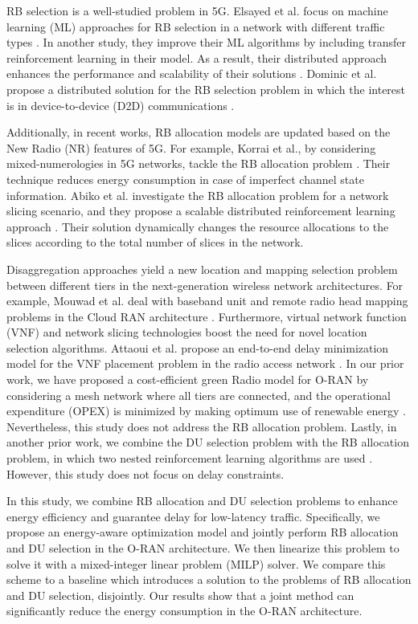 \documentclass[conference]{IEEEtran}
\begin{document}
\par RB selection is a well-studied problem in 5G. Elsayed et al. focus on machine learning (ML) approaches for RB selection in a network with different traffic types \cite{Elsayed2019}. In another study, they improve their ML algorithms by including transfer reinforcement learning in their model. As a result, their distributed approach enhances the performance and scalability of their solutions \cite{Elsayed2020}. Dominic et al. propose a distributed solution for the RB selection problem in which the interest is in device-to-device (D2D) communications \cite{Dominic2020}. 
\par Additionally, in recent works, RB allocation models are updated based on the New Radio (NR) features of 5G. For example, Korrai et al., by considering mixed-numerologies in 5G networks, tackle the RB allocation problem \cite{Korrai2020}. Their technique reduces energy consumption in case of imperfect channel state information. Abiko et al. investigate the RB allocation problem for a network slicing scenario, and they propose a scalable distributed reinforcement learning approach \cite{Abiko2020}. Their solution dynamically changes the resource allocations to the slices according to the total number of slices in the network.
\par Disaggregation approaches yield a new location and mapping selection problem between different tiers in the next-generation wireless network architectures. For example, Mouwad et al. deal with baseband unit and remote radio head mapping problems in the Cloud RAN architecture \cite{Mouawad2019}. Furthermore, virtual network function (VNF) and network slicing technologies boost the need for novel location selection algorithms. Attaoui et al. propose an end-to-end delay minimization model for the VNF placement problem in the radio access network \cite{Attaoui2020}. In our prior work, we have proposed a cost-efficient green Radio model for O-RAN by considering a mesh network where all tiers are connected, and the operational expenditure (OPEX) is minimized by making optimum use of renewable energy  \cite{Pamuklu2020}. Nevertheless, this study does not address the RB allocation problem. Lastly, in another prior work, we combine the DU selection problem with the RB allocation problem, in which two nested reinforcement learning algorithms are used \cite{Mollahasani2021a}. However, this study does not focus on delay constraints.

\par In this study, we combine RB allocation and DU selection problems to enhance energy efficiency and guarantee delay for low-latency traffic. Specifically, we propose an energy-aware optimization model and jointly perform RB allocation and DU selection in the O-RAN architecture. We then linearize this problem to solve it with a mixed-integer linear problem (MILP) solver. We compare this scheme to a baseline which introduces a solution to the problems of RB allocation and DU selection, disjointly. Our results show that a joint method can significantly reduce the energy consumption in the O-RAN architecture.
\end{document}

